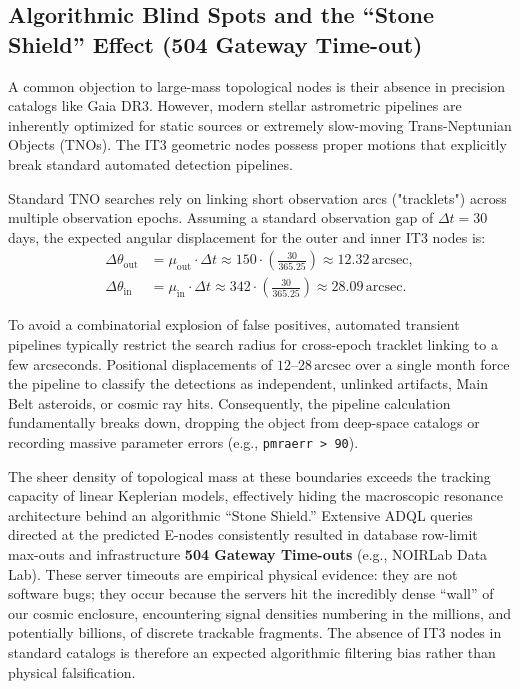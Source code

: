 \documentclass[11pt,a4paper]{article}
\theoremstyle{remark}
\newcommand{\arcsec}{\,\mathrm{arcsec}}
\begin{document}
\subsection{Algorithmic Blind Spots and the ``Stone Shield'' Effect (504 Gateway Time-out)}

A common objection to large-mass topological nodes is their absence in precision catalogs like Gaia DR3. However, modern stellar astrometric pipelines are inherently optimized for static sources or extremely slow-moving Trans-Neptunian Objects (TNOs). The IT3 geometric nodes possess proper motions that explicitly break standard automated detection pipelines.

Standard TNO searches rely on linking short observation arcs ("tracklets") across multiple observation epochs. Assuming a standard observation gap of $\Delta t = 30$ days, the expected angular displacement for the outer and inner IT3 nodes is:
\begin{align}
    \Delta\theta_{\text{out}} &= \mu_{\text{out}} \cdot \Delta t \approx 150 \cdot \left(\frac{30}{365.25}\right) \approx 12.32 \arcsec, \label{eq:shift_out} \\
    \Delta\theta_{\text{in}} &= \mu_{\text{in}} \cdot \Delta t \approx 342 \cdot \left(\frac{30}{365.25}\right) \approx 28.09 \arcsec. \label{eq:shift_in}
\end{align}

To avoid a combinatorial explosion of false positives, automated transient pipelines typically restrict the search radius for cross-epoch tracklet linking to a few arcseconds. Positional displacements of $12$--$28 \arcsec$ over a single month force the pipeline to classify the detections as independent, unlinked artifacts, Main Belt asteroids, or cosmic ray hits. Consequently, the pipeline calculation fundamentally breaks down, dropping the object from deep-space catalogs or recording massive parameter errors (e.g., \texttt{pmraerr > 90}). 

The sheer density of topological mass at these boundaries exceeds the tracking capacity of linear Keplerian models, effectively hiding the macroscopic resonance architecture behind an algorithmic ``Stone Shield.'' Extensive ADQL queries directed at the predicted E-nodes consistently resulted in database row-limit max-outs and infrastructure \textbf{504 Gateway Time-outs} (e.g., NOIRLab Data Lab). These server timeouts are empirical physical evidence: they are not software bugs; they occur because the servers hit the incredibly dense ``wall'' of our cosmic enclosure, encountering signal densities numbering in the millions, and potentially billions, of discrete trackable fragments. The absence of IT3 nodes in standard catalogs is therefore an expected algorithmic filtering bias rather than physical falsification.
\end{document}
